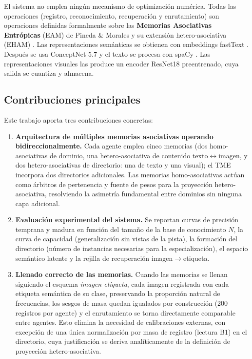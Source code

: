 El sistema no emplea ningún mecanismo de optimización numérica.
Todas las operaciones (registro, reconocimiento, recuperación y enrutamiento) son
operaciones definidas formalmente sobre las \textbf{Memorias Asociativas Entrópicas}
(EAM) de Pineda \& Morales y su extensión hetero-asociativa (EHAM)
\cite{pineda2021entropic,morales2024hetero}.
Las representaciones semánticas se obtienen con embeddings fastText
\cite{bojanowski2017fasttext}.
Después se usa ConceptNet 5.7 \cite{speer2017conceptnet}
y el texto se procesa con spaCy \cite{honnibal2020spacy}.
Las representaciones visuales las produce un encoder ResNet18 \cite{he2016resnet}
preentrenado, cuya salida se cuantiza y almacena.

\subsection*{Contribuciones principales}

Este trabajo aporta tres contribuciones concretas:

\begin{enumerate}
    \item \textbf{Arquitectura de múltiples memorias asociativas operando bidireccionalmente.}
    Cada agente emplea cinco memorias (dos homo-asociativas de dominio, una
    hetero-asociativa de contenido texto$\leftrightarrow$imagen, y dos hetero-asociativas
    de directorio: una de texto y una visual); el TME incorpora dos directorios adicionales.
    Las memorias homo-asociativas actúan como árbitros de pertenencia y fuente de pesos
    para la proyección hetero-asociativa, resolviendo la asimetría fundamental entre
    dominios sin ninguna capa adicional.

    \item \textbf{Evaluación experimental del sistema.}
    Se reportan curvas de precisión temprana y madura en función del tamaño de la base
    de conocimiento $N$, la curva de capacidad (generalización sin vistas de la pista), la
    formación del directorio (número de instancias necesarias para la especialización),
    el espacio semántico latente y la rejilla de recuperación imagen$\to$etiqueta.

    \item \textbf{Llenado correcto de las memorias.}
    Cuando las memorias se llenan siguiendo el esquema \emph{imagen-etiqueta}, cada imagen
    registrada con cada etiqueta semántica de su clase, preservando la proporción natural
    de frecuencias, los sesgos de masa quedan igualados por construcción (200 registros
    por agente) y el enrutamiento se torna directamente comparable entre agentes.
    Esto elimina la necesidad de calibraciones externas, con excepción de una única
    normalización por masa de registro (lectura B1) en el directorio, cuya justificación
    se deriva analíticamente de la definición de proyección hetero-asociativa.
\end{enumerate}

